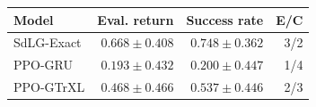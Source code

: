 \begin{tabular}{lrrr}
\toprule
Model & Eval. return & Success rate & E/C \\
\midrule
SdLG-Exact & $0.668\pm0.408$ & $0.748\pm0.362$ & 3/2 \\
PPO-GRU & $0.193\pm0.432$ & $0.200\pm0.447$ & 1/4 \\
PPO-GTrXL & $0.468\pm0.466$ & $0.537\pm0.446$ & 2/3 \\
\bottomrule
\end{tabular}
